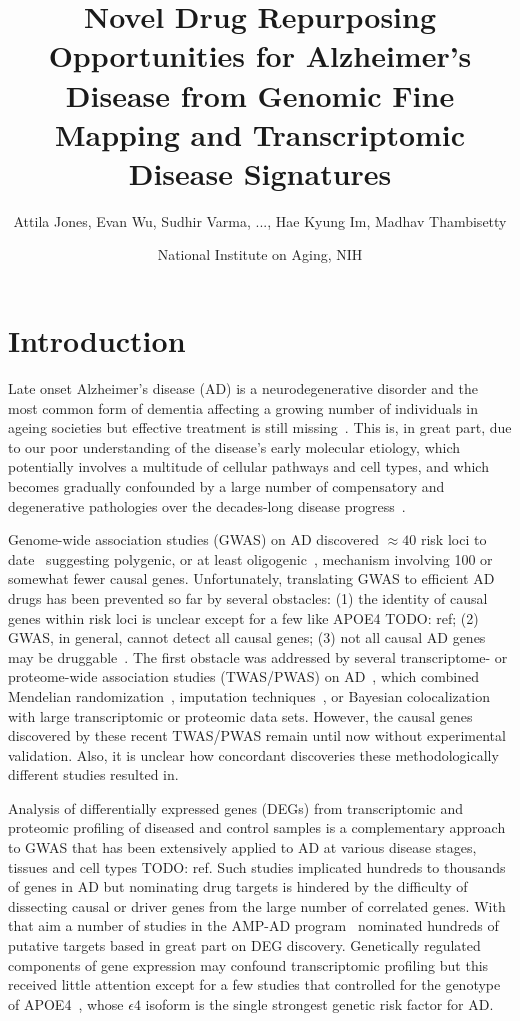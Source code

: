 \documentclass[letterpaper]{article}
\title{Novel Drug Repurposing Opportunities for Alzheimer's Disease from
  Genomic Fine Mapping and Transcriptomic Disease Signatures}
\author{Attila Jones, Evan Wu, Sudhir Varma, ..., Hae Kyung Im, Madhav Thambisetty}
\date{National Institute on Aging, NIH}
\begin{document}
\maketitle

\section{Introduction}

Late onset Alzheimer's disease (AD) is a neurodegenerative disorder and the most
common form of dementia affecting a growing number of individuals in ageing
societies but effective treatment is still
missing~\citep{Bondi2017,Masters2015}.  This is, in great part,
due to our poor understanding of the disease's early molecular etiology,
which potentially involves a multitude of cellular pathways and cell types,
and which becomes gradually confounded by a large number of compensatory
and degenerative pathologies over the decades-long disease
progress~\citep{DeStrooper2016}.

Genome-wide association studies (GWAS) on AD discovered $\approx 40$ risk loci
to date~\citep{Jansen2019,Kunkle2019,Schwartzentruber2021,Wightman2021}
suggesting polygenic, or at least oligogenic~\citep{Zhang2020}, mechanism
involving 100 or somewhat fewer causal genes.  Unfortunately, translating GWAS to
efficient AD drugs has been prevented so far by several obstacles: (1) the
identity of causal genes within risk loci is unclear except for a few like
APOE4 TODO: ref; (2) GWAS, in general, cannot detect all causal genes; (3) not
all causal AD genes may be
druggable~\citep{Cao2014,Lau2020,Floris2018,Finan2017}.  The first obstacle
was addressed by several transcriptome- or proteome-wide association
studies (TWAS/PWAS) on
AD~\citep{Jansen2019,Kunkle2019,Gerring2020,Baird2021,Schwartzentruber2021,Wingo2021},
which combined Mendelian randomization~\citep{DaveySmith2014,Lawlor2008},
imputation techniques~\citep{Barbeira2018}, or Bayesian
colocalization~\citep{Wen2017} with large transcriptomic or proteomic data
sets.  However, the causal genes discovered by these recent TWAS/PWAS remain
until now without experimental validation.  Also, it is unclear how concordant
discoveries these methodologically different studies resulted in.

Analysis of differentially expressed genes (DEGs) from transcriptomic and
proteomic profiling of diseased and control samples is a complementary
approach to GWAS that has been extensively applied to AD at various disease
stages, tissues and cell types TODO: ref.  Such studies implicated hundreds to
thousands of genes in AD but nominating drug targets is hindered by the
difficulty of dissecting causal or driver genes from the large number of
correlated genes.  With that aim a number of studies in the AMP-AD
program~\citep{Greenwood2020} nominated hundreds of putative targets based in
great part on DEG discovery.  Genetically regulated components of gene
expression may confound transcriptomic profiling but this received little attention
except for a few studies that controlled for the genotype of
APOE4~\citep{Taubes2021,Lin2018,RobertsJackson2021}, whose $\epsilon 4$
isoform is the single strongest genetic risk factor for AD.
\end{document}
